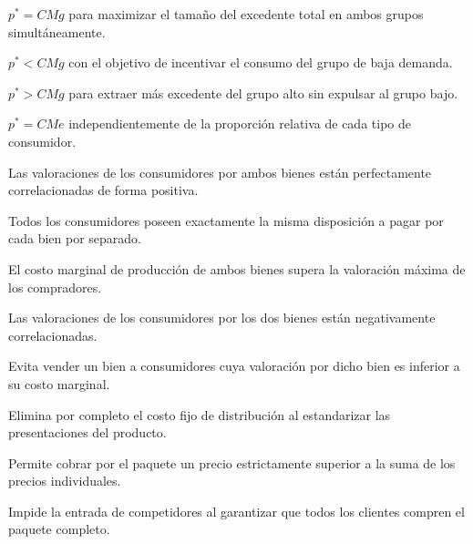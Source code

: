 \begin{opts}
    \item $p^* = CMg$ para maximizar el tamaño del excedente total en ambos grupos simultáneamente.
    \item $p^* < CMg$ con el objetivo de incentivar el consumo del grupo de baja demanda.
    \item $p^* > CMg$ para extraer más excedente del grupo alto sin expulsar al grupo bajo.
    \item $p^* = CMe$ independientemente de la proporción relativa de cada tipo de consumidor.
\end{opts}

\begin{opts}
    \item Las valoraciones de los consumidores por ambos bienes están perfectamente correlacionadas de forma positiva.
    \item Todos los consumidores poseen exactamente la misma disposición a pagar por cada bien por separado.
    \item El costo marginal de producción de ambos bienes supera la valoración máxima de los compradores.
    \item Las valoraciones de los consumidores por los dos bienes están negativamente correlacionadas.
\end{opts}

\begin{opts}
    \item Evita vender un bien a consumidores cuya valoración por dicho bien es inferior a su costo marginal.
    \item Elimina por completo el costo fijo de distribución al estandarizar las presentaciones del producto.
    \item Permite cobrar por el paquete un precio estrictamente superior a la suma de los precios individuales.
    \item Impide la entrada de competidores al garantizar que todos los clientes compren el paquete completo.
\end{opts}

